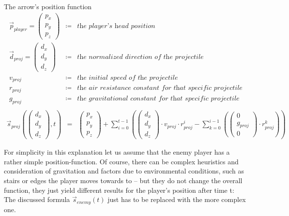 \begin{mydef}{The arrow's position function}{
    \begin{eqnarray*}
        \overrightarrow{p}_{player} = {\begin{pmatrix} p_x \\ p_y \\ p_z \end{pmatrix}} & \coloneqq & \textit{the player's head position} \\
        \overrightarrow{d}_{proj} = {\begin{pmatrix} d_x \\ d_y \\ d_z \end{pmatrix}} & \coloneqq & \textit{the normalized direction of the projectile} \\
        v_{proj} & \coloneqq & \textit{the initial speed of the projectile} \\
        r_{proj} & \coloneqq & \textit{the air resistance constant for that specific projectile} \\
        g_{proj} & \coloneqq & \textit{the gravitational constant for that specific projectile} \\
    \end{eqnarray*}
}
    \begin{eqnarray*}
        \overrightarrow{s}_{proj}({\begin{pmatrix} d_x \\ d_y \\ d_z \end{pmatrix}}, t) & = & {\begin{pmatrix} p_x \\ p_y \\ p_z \end{pmatrix}} + \sum_{i=0}^{t-1} ({\begin{pmatrix} d_x \\ d_y \\ d_z \end{pmatrix}} \cdot v_{proj} \cdot r_{proj}^i - \sum_{k = 0}^{i - 1}({\begin{pmatrix} 0 \\ g_{proj} \\ 0 \end{pmatrix}} \cdot r_{proj}^k))
    \end{eqnarray*}
\end{mydef}

For simplicity in this explanation let us assume that the enemy player has a rather simple position-function. Of course, there can be complex heuristics and consideration of gravitation and factors due to environmental conditions, such as stairs or edges the player moves towards to – but they do not change the overall function, they just yield different results for the player’s position after time t: The discussed formula $\overrightarrow{s}_{enemy}(t)$ just has to be replaced with the more complex one.

